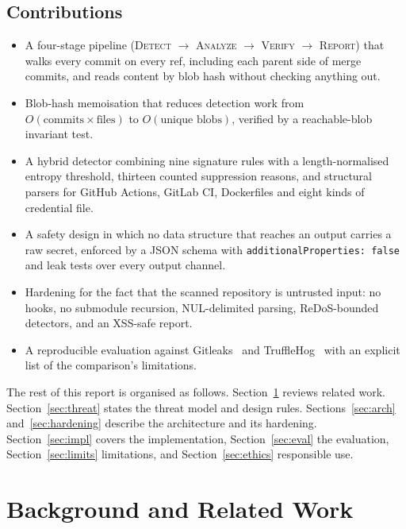 \documentclass[conference]{IEEEtran}
\newcommand{\code}[1]{\texttt{#1}}
\begin{document}
\subsection{Contributions}
\begin{itemize}
\item A four-stage pipeline (\textsc{Detect} $\rightarrow$ \textsc{Analyze} $\rightarrow$
  \textsc{Verify} $\rightarrow$ \textsc{Report}) that walks every commit on every ref, including
  each parent side of merge commits, and reads content by blob hash without checking anything out.
\item Blob-hash memoisation that reduces detection work from $O(\text{commits}\times\text{files})$
  to $O(\text{unique blobs})$, verified by a reachable-blob invariant test.
\item A hybrid detector combining nine signature rules with a length-normalised entropy threshold,
  thirteen counted suppression reasons, and structural parsers for GitHub Actions, GitLab CI,
  Dockerfiles and eight kinds of credential file.
\item A safety design in which no data structure that reaches an output carries a raw secret,
  enforced by a JSON schema with \code{additionalProperties: false} and leak tests over every
  output channel.
\item Hardening for the fact that the scanned repository is untrusted input: no hooks, no
  submodule recursion, NUL-delimited parsing, ReDoS-bounded detectors, and an XSS-safe report.
\item A reproducible evaluation against Gitleaks~\cite{gitleaks} and TruffleHog~\cite{trufflehog}
  with an explicit list of the comparison's limitations.
\end{itemize}

The rest of this report is organised as follows. Section~\ref{sec:related} reviews related work.
Section~\ref{sec:threat} states the threat model and design rules. Sections~\ref{sec:arch}
and~\ref{sec:hardening} describe the architecture and its hardening. Section~\ref{sec:impl} covers
the implementation, Section~\ref{sec:eval} the evaluation, Section~\ref{sec:limits} limitations,
and Section~\ref{sec:ethics} responsible use.

\section{Background and Related Work}\label{sec:related}
\end{document}
